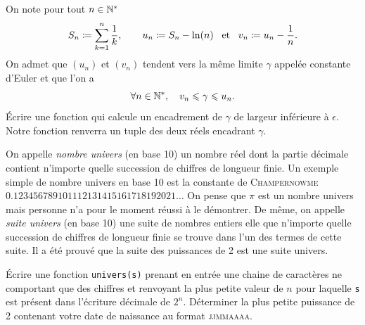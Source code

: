 \documentclass{magnoliaold}
\begin{document}


On note pour tout $n \in {\mathbb{N}^*}$
\[S_n\coloneqq \sum_{k=1}^{n} \frac{1}{k},\qquad
	u_n\coloneqq S_n-\ln(n) \quad\!\text{et}\quad\! v_n\coloneqq u_n-\frac{1}{n}.\] 
On admet que $(u_n)$ et $(v_n)$ tendent vers la même limite $\gamma$ appelée constante
d'Euler et que l'on a
\[\forall n \in{\mathbb{N}^*} ,\quad v_n \leqslant \gamma \leqslant u_n.\]
Écrire une fonction qui calcule un encadrement de $\gamma$ de largeur inférieure à $\epsilon$.
Notre fonction renverra un tuple des deux réels encadrant $\gamma$.



On appelle \emph{nombre univers} (en base 10) un nombre réel dont la partie décimale contient
n'importe quelle succession de chiffres de longueur finie. Un exemple simple de nombre
univers en base 10 est la constante de \textsc{Champernowme} $0.123456789101112131415161718192021\ldots$ On pense que $\pi$ est un nombre univers mais
personne n'a pour le moment réussi à le démontrer. De même, on appelle \emph{suite univers} (en base 10) une suite de nombres entiers elle que n'importe quelle succession de chiffres
de longueur finie se trouve dans l'un des termes de cette suite. Il a été prouvé que la
suite des puissances de 2 est une suite univers.
\begin{questions}
\question Écrire une fonction \verb!univers(s)! prenant en entrée une chaine de caractères
  ne comportant que des chiffres et renvoyant la plus petite valeur de $n$ pour laquelle
	\verb!s! est présent dans l'écriture décimale de $2^n$.
\question Déterminer la plus petite puissance de 2 contenant votre date de naissance
  au format \textsc{jjmmaaaa}.
\end{questions}
\end{document}
